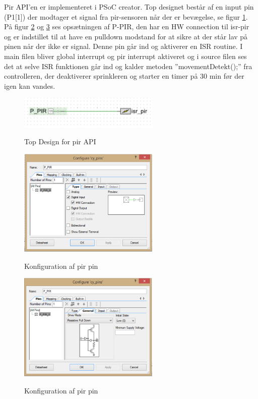 Pir API'en er implementeret i PSoC creator. Top designet består af en input pin (P1[1]) der modtager et signal fra pir-sensoren når der er bevægelse, se figur \ref{lab:pir_topdesign}. På figur \ref{lab:pir_topdesign_1} og \ref{lab:pir_topdesign_2} ses opsætningen af P-PIR, den har en HW connection til isr-pir og er indstillet til at have en pulldown modstand for at sikre at der står lav på pinen når der ikke er signal. Denne pin går ind og aktiverer en ISR routine. I main filen bliver global interrupt og pir interrupt aktiveret og i source filen ses det at selve ISR funktionen går ind og kalder metoden ''movementDetekt();'' fra controlleren, der deaktiverer sprinkleren og starter en timer på 30 min før der igen kan vandes.   

\begin{figure}[htb]
\centering
{\includegraphics[width=0.60\textwidth]{filer/pics/pir_api_topdesign}}
\caption{Top Design for pir API}
\label{lab:pir_topdesign}
\end{figure}

\begin{figure}[htb]
\centering
{\includegraphics[width=0.60\textwidth]{filer/pics/pir_api_topdesign_1}}
\caption{Konfiguration af pir pin}
\label{lab:pir_topdesign_1}
\end{figure}

\begin{figure}[H]
\centering
{\includegraphics[width=0.60\textwidth]{filer/pics/pir_api_topdesign_2}}
\caption{Konfiguration af pir pin}
\label{lab:pir_topdesign_2}
\end{figure}

